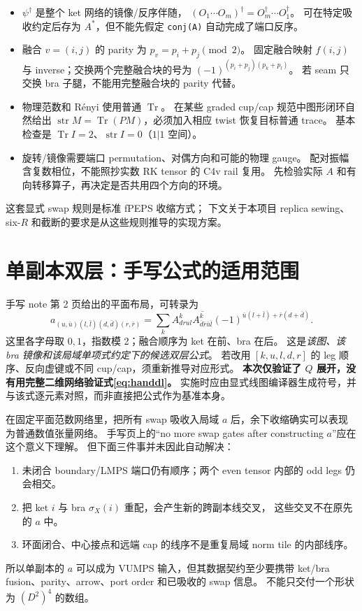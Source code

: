 \documentclass[11pt]{article}
\newcommand{\Tr}{\operatorname{Tr}}
\newcommand{\str}{\operatorname{str}}
\newcommand{\code}[1]{\texttt{\small #1}}
\begin{document}
\begin{itemize}
\item $\psi^\dagger$ 是整个 ket 网络的镜像/反序伴随，
      $(O_1\cdots O_m)^\dagger=O_m^\dagger\cdots O_1^\dagger$。
      可在特定吸收约定后存为 $A^*$，但不能先假定 \code{conj(A)} 自动完成了端口反序。
\item 融合 $v=(i,j)$ 的 parity 为 $p_v=p_i+p_j\pmod2$。
      固定融合映射 $f(i,j)$ 与 inverse；交换两个完整融合块的号为
      $(-1)^{(p_i+p_j)(p_k+p_l)}$。
      若 seam 只交换 bra 子腿，不能用完整融合块的 parity 代替。
\item 物理范数和 Rényi 使用普通 $\Tr$。
      在某些 graded cup/cap 规范中图形闭环自然给出
      $\str M=\Tr(PM)$，必须加入相应 twist 恢复目标普通 trace。
      基本检查是 $\Tr I=2$、$\str I=0$（$1|1$ 空间）。
\item 旋转/镜像需要端口 permutation、对偶方向和可能的物理 gauge。
      配对振幅含复数相位，不能照抄实数 RK tensor 的 C4v rail 复用。
      先检验实际 $A$ 和有向转移算子，再决定是否共用四个方向的环境。
\end{itemize}
这套显式 swap 规则是标准 fPEPS 收缩方式\cite{corboz}；
下文关于本项目 replica sewing、six-$R$ 和截断的要求是从这些规则推导的实现方案。

\section{单副本双层：手写公式的适用范围}

手写 note 第 2 页给出的平面布局，可转录为
\begin{equation}
 a_{(u,\bar u)(l,\bar l)(d,\bar d)(r,\bar r)}
 =\sum_k A^k_{drul}\overline{A^k_{\bar d\bar r\bar u\bar l}}
 (-1)^{\bar u(l+\bar l)+\bar r(d+\bar d)}.
 \label{eq:handdl}
\end{equation}
这里各字母取 $0,1$，指数模 2；融合顺序为 ket 在前、bra 在后。
这是\emph{该图、该 bra 镜像和该局域单项式约定下的候选双层公式}。
若改用 $[k,u,l,d,r]$ 的 leg 顺序、反向虚键或不同 cup/cap，须重新推导对应形式。
\textbf{本次仅验证了 $Q$ 展开，没有用完整二维网络验证式\eqref{eq:handdl}。}
实施时应由显式线图编译器生成符号，并与该式逐元素对照，而非直接把公式作为基准本身。

在固定平面范数网络里，把所有 swap 吸收入局域 $a$ 后，余下收缩确实可以表现为普通数值张量网络。
手写页上的“no more swap gates after constructing $a$”应在这个意义下理解。
但下面三件事并未因此自动解决：
\begin{enumerate}
\item 未闭合 boundary/LMPS 端口仍有顺序；两个 even tensor 内部的 odd legs 仍会相交。
\item 把 ket $i$ 与 bra $\sigma_X(i)$ 重配，会产生新的跨副本线交叉，
      这些交叉不在原先的 $a$ 中。
\item 环面闭合、中心接点和远端 cap 的线序不是重复局域 norm tile 的内部线序。
\end{enumerate}
所以单副本的 $a$ 可以成为 VUMPS 输入，但其数据契约至少要携带
ket/bra fusion、parity、arrow、port order 和已吸收的 swap 信息。
不能只交付一个形状为 $(D^2)^4$ 的数组。
\end{document}
